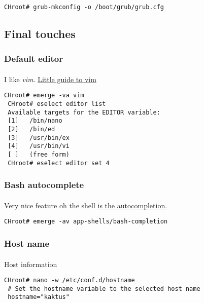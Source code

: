 \documentclass[11pt,a4paper]{article}
\begin{document}
                    \begin{lstlisting}[style=BashInputCHRoot]
 CHroot# grub-mkconfig -o /boot/grub/grub.cfg
                    \end{lstlisting}

            \newpage
        \subsection{Final touches}

                \subsubsection{Default editor}

                    \paragraph{} I like \textit{vim}. \href{https://wiki.gentoo.org/wiki/Vim/Guide}{Little guide to vim}
                    \begin{lstlisting}[style=BashInputCHRoot]
 CHroot# emerge -va vim
 CHroot# eselect editor list
 Available targets for the EDITOR variable:
 [1]   /bin/nano
 [2]   /bin/ed
 [3]   /usr/bin/ex
 [4]   /usr/bin/vi
 [ ]   (free form)
 CHroot# eselect editor set 4
                    \end{lstlisting}

                \newpage
                \subsubsection{Bash autocomplete}
                    \paragraph{} Very nice feature oh the shell  \href{https://wiki.gentoo.org/wiki/Bash#Tab_completion}{is the autocompletion.}

                    \begin{lstlisting}[style=BashInputCHRoot]
 CHroot# emerge -av app-shells/bash-completion
                    \end{lstlisting}

                \newpage
                \subsubsection{Host name}
                    \paragraph{} Host information
                    \begin{lstlisting}[style=BashInputCHRoot]
 CHroot# nano -w /etc/conf.d/hostname
 # Set the hostname variable to the selected host name
 hostname="kaktus"
                    \end{lstlisting}
\end{document}
